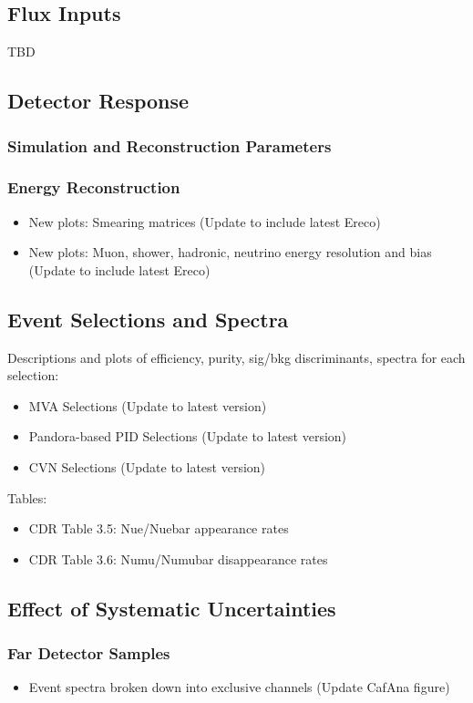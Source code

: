 \subsection{Flux Inputs}
TBD

\subsection{Detector Response}
\subsubsection{Simulation and Reconstruction Parameters}
\subsubsection{Energy Reconstruction}
\begin{itemize}
\item New plots: Smearing matrices (Update to include latest Ereco)
\item New plots: Muon, shower, hadronic, neutrino energy resolution and bias  (Update to include latest Ereco)
\end{itemize}

\subsection{Event Selections and Spectra}
Descriptions and plots of efficiency, purity, sig/bkg discriminants, spectra for each selection:
\begin{itemize}
\item MVA Selections (Update to latest version)
\item Pandora-based PID Selections (Update to latest version)
\item CVN Selections (Update to latest version)
\end{itemize}

Tables:
\begin{itemize}
	\item CDR Table 3.5: Nue/Nuebar appearance rates
	\item CDR Table 3.6: Numu/Numubar disappearance rates
\end{itemize}

\subsection{Effect of Systematic Uncertainties}
\subsubsection{Far Detector Samples}
\begin{itemize}
\item Event spectra broken down into exclusive channels (Update CafAna figure)
\end{itemize}
